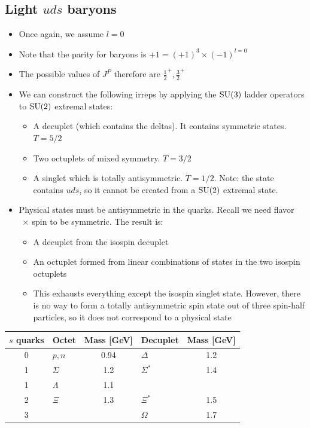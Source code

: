 \subsection{Light $uds$ baryons}
\begin{itemize}
  \item Once again, we assume $l=0$
  \item Note that the parity for baryons is $+1 = (+1)^3\times (-1)^{l=0}$
  \item The possible values of $J^P$ therefore are $\frac{1}{2}^+, \frac{3}{2}^+$
  \item We can construct the following irreps by applying the $\operatorname{SU}(3)$ ladder operators to $\operatorname{SU}(2)$ extremal states:
  \begin{itemize}
    \item A decuplet (which contains the deltas). It contains symmetric states. $T = 5/2$
    \item Two octuplets of mixed symmetry. $T = 3/2$
    \item A singlet which is totally antisymmetric. $T = 1/2$. Note: the state contains $uds$, so it cannot be created from a $\operatorname{SU}(2)$ extremal state. 
  \end{itemize}
  \item Physical states must be antisymmetric in the quarks. Recall we need flavor$~\times~$spin to be symmetric. The result is:
  \begin{itemize}
    \item A decuplet from the isospin decuplet
    \item An octuplet formed from linear combinations of states in the two isospin octuplets
    \item This exhausts everything except the isospin singlet state. However, there is no way to form a totally antisymmetric spin state out of three spin-half particles, so it does not correspond to a physical state
  \end{itemize}
\end{itemize}
  \begin{center}\begin{tabular}{c|lc|lc}
  $s$ quarks & Octet & Mass [GeV] & Decuplet & Mass [GeV]\\\hline
  0 & $p,n$ & 0.94 & $\Delta$ & 1.2\\
  1 & $\Sigma$ & 1.2 & $\Sigma^*$ & 1.4\\
  1 & $\Lambda$ & 1.1 \\
  2 & $\Xi$ & 1.3 & $\Xi^*$ & 1.5 \\
  3 &&& $\Omega$ & 1.7
  \end{tabular}\end{center}

